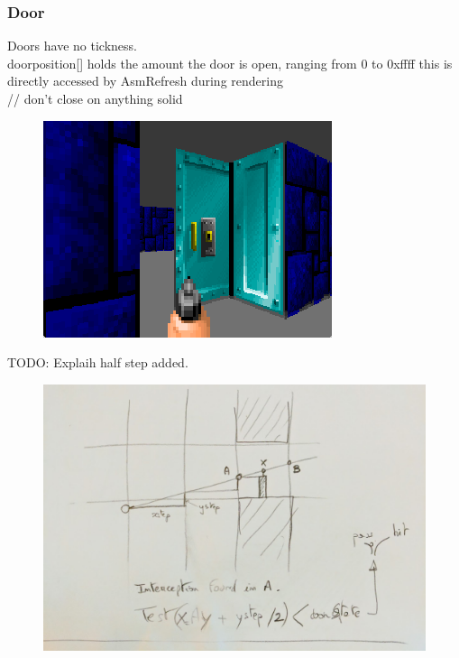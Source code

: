  





\subsubsection{Door}
Doors have no tickness.\\
doorposition[] holds the amount the door is open, ranging from 0 to 0xffff
  this is directly accessed by AsmRefresh during rendering\\
  // don't close on anything solid\\
\begin{figure}[H]
 \centering
 \includegraphics[width=\textwidth]{screenshots/door_flat.png}
\end{figure}

\par
TODO: Explaih half step added.\\
\par 
 \par
\begin{figure}[H]
  \centering
 \includegraphics[width=\textwidth]{imgs/drawings/test_door.png}
\end{figure}
\par












